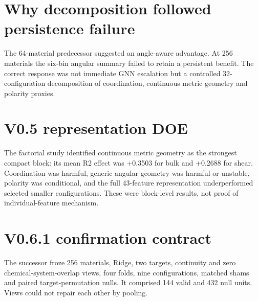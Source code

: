 \documentclass[11pt,a4paper,oneside]{report}
\begin{document}
\begin{center}
\end{center}


\section{Why decomposition followed persistence failure}
The 64-material predecessor suggested an angle-aware advantage. At 256 materials the
six-bin angular summary failed to retain a persistent benefit. The correct response was
not immediate GNN escalation but a controlled 32-configuration decomposition of
coordination, continuous metric geometry and polarity proxies.

\section{V0.5 representation DOE}
The factorial study identified continuous metric geometry as the strongest compact
block: its mean R2 effect was +0.3503 for bulk and +0.2688 for shear. Coordination was
harmful, generic angular geometry was harmful or unstable, polarity was conditional,
and the full 43-feature representation underperformed selected smaller configurations.
These were block-level results, not proof of individual-feature mechanism.

\section{V0.6.1 confirmation contract}
The successor froze 256 materials, Ridge, two targets, continuity and zero
chemical-system-overlap views, four folds, nine configurations, matched shams and
paired target-permutation nulls. It comprised 144 valid and 432 null units. Views could
not repair each other by pooling.
\end{document}
